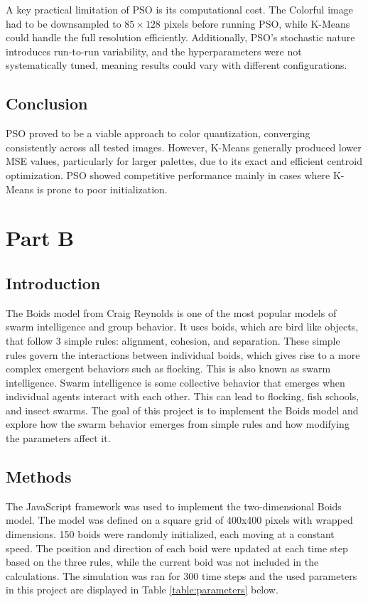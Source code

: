 \documentclass{article}
\begin{document}
A key practical limitation of PSO is its computational cost. The Colorful image had to be downsampled 
to $85 \times 128$ pixels before running PSO, while K-Means could handle the full resolution efficiently. 
Additionally, PSO's stochastic nature introduces run-to-run variability, and the hyperparameters were not 
systematically tuned, meaning results could vary with different configurations.

\subsection{Conclusion}
PSO proved to be a viable approach to color quantization, converging consistently across all tested 
images. However, K-Means generally produced lower MSE values, particularly for larger palettes, due 
to its exact and efficient centroid optimization. PSO showed competitive performance mainly in cases 
where K-Means is prone to poor initialization.


\section{Part B}
\subsection{Introduction}



The Boids model from Craig Reynolds is one of the most popular models of swarm intelligence and group behavior. It uses boids, which are bird like objects, that follow 3 simple rules: alignment, cohesion, and separation. These simple rules govern the interactions between individual boids, which gives rise to a more complex emergent behaviors such as flocking. This is also known as swarm intelligence. Swarm intelligence is some collective behavior that emerges when individual agents interact with each other. This can lead to flocking, fish schools, and insect swarms. 
The goal of this project is to implement the Boids model and explore how the swarm behavior emerges from simple rules and how modifying the parameters affect it.




\subsection{Methods}


The JavaScript framework was used to implement the two-dimensional Boids model. The model was defined on a square grid of 400x400 pixels with wrapped dimensions. 150 boids were randomly initialized, each moving at a constant speed. The position and direction of each boid were updated at each time step based on the three rules, while the current boid was not included in the calculations. The simulation was ran for 300 time steps and the used parameters in this project are displayed in Table \ref{table:parameters} below. 
\end{document}
